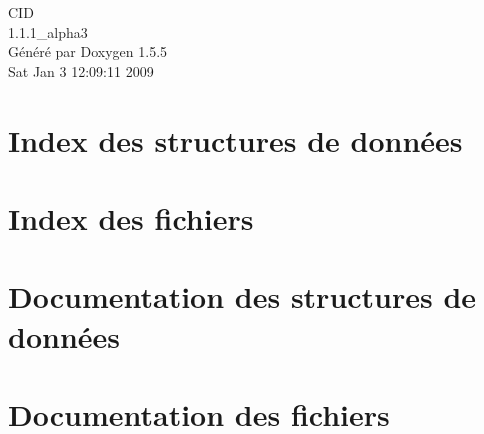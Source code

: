\documentclass[a4paper]{book}
\begin{document}
\begin{titlepage}
\vspace*{7cm}
\begin{center}
{\Large CID \\[1ex]\large 1.1.1\_\-alpha3 }\\
\vspace*{1cm}
{\large Généré par Doxygen 1.5.5}\\
\vspace*{0.5cm}
{\small Sat Jan 3 12:09:11 2009}\\
\end{center}
\end{titlepage}
\clearemptydoublepage
{}
\tableofcontents
\clearemptydoublepage
{}
\chapter{Index des structures de données}

\chapter{Index des fichiers}

\chapter{Documentation des structures de données}




\chapter{Documentation des fichiers}

























\printindex
\end{document}
